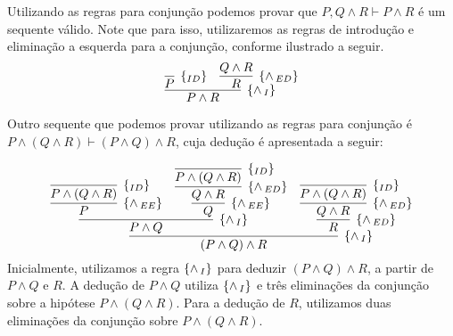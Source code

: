 \begin{Example}
     Utilizando as regras para conjun\c{c}\~ao podemos provar que $P,
     Q \land R \vdash P \land R$ \'e um sequente v\'alido. Note que
     para isso, utilizaremos as regras de introdu\c{c}\~ao e
     elimina\c{c}\~ao a esquerda para a conjun\c{c}\~ao, conforme
     ilustrado a seguir.
     \[
         \infer[\andI]
                  {P \land R}
                  {
                    \infer[\Id]
                            {P}{}
                     &
                     \infer[\andED]
                              {R}
                              {Q \land R}
                  }
     \]
\end{Example}
\begin{Example}
     Outro sequente que podemos provar utilizando as regras para
     conjun\c{c}\~ao \'e $P\land (Q\land R) \vdash (P \land Q) \land
     R$, cuja dedu\c{c}\~ao \'e apresentada a seguir:

    \[
         \infer[\andI]
                 {(P \land Q) \land R}
                {
                    \infer[\andI]
                             {P\land Q}
                             {
                                 \infer[\andEE]
                                          {P}
                                          {
                                             \infer[\Id]{P\land
                                               (Q\land R)} {}
                                         }
                                  &
                                  \infer[\andEE]
                                           {Q}
                                           {
                                              \infer[\andED]
                                                       {Q\land R}
                                                       {
                                                         \infer[\Id]{P\land
                                                           (Q\land
                                                           R)}{}
                                                       }
                                           }
                             }
                   &
                   \infer[\andED]
                           {R}
                           {
                              \infer[\andED]
                                       {Q \land R}
                                       {
                                         \infer[\Id]{P\land (Q\land
                                           R)}{}
                                        }
                           }
                }
    \]
    Inicialmente, utilizamos a regra $\scriptsize{\{\land\,_I\}}$ para deduzir $(P\land
    Q)\land R$, a partir de $P\land Q$ e $R$. A dedu\c{c}\~ao de
    $P\land Q$ utiliza $\scriptsize{\{\land\,_I\}}$ e tr\^es elimina\c{c}\~oes da
    conjun\c{c}\~ao sobre a hip\'otese $P \land (Q\land R)$. Para a
    dedu\c{c}\~ao de $R$, utilizamos duas elimina\c{c}\~oes da
    conjun\c{c}\~ao sobre $P\land (Q\land R)$.
\end{Example}

